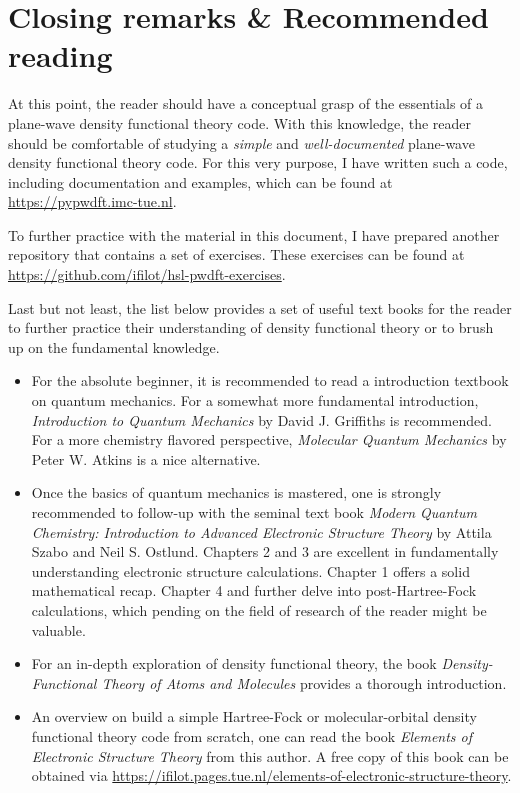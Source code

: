 %
%
%
\section{Closing remarks \& Recommended reading}
\label{chap:further_reading}

At this point, the reader should have a conceptual grasp of the essentials of a plane-wave density functional theory code. With this knowledge, the reader should be comfortable of studying a \textit{simple} and \textit{well-documented} plane-wave density functional theory code. For this very purpose, I have written such a code, including documentation and examples, which can be found at \url{https://pypwdft.imc-tue.nl}. 

To further practice with the material in this document, I have prepared another repository that contains a set of exercises. These exercises can be found at \url{https://github.com/ifilot/hsl-pwdft-exercises}.

Last but not least, the list below provides a set of useful text books for the reader to further practice their understanding of density functional theory or to brush up on the fundamental knowledge.

\begin{itemize}
    \item For the absolute beginner, it is recommended to read a introduction textbook on quantum mechanics. For a somewhat more fundamental introduction, \textit{Introduction to Quantum Mechanics}\cite{2004:griffiths} by David J. Griffiths is recommended. For a more chemistry flavored perspective, \textit{Molecular Quantum Mechanics}\cite{2011:atkins} by Peter W. Atkins is a nice alternative.
    
    \item Once the basics of quantum mechanics is mastered, one is strongly recommended to follow-up with the seminal text book \textit{Modern Quantum Chemistry: Introduction to Advanced Electronic Structure Theory}\cite{szabo} by Attila Szabo and Neil S. Ostlund. Chapters 2 and 3 are excellent in fundamentally understanding electronic structure calculations. Chapter 1 offers a solid mathematical recap. Chapter 4 and further delve into post-Hartree-Fock calculations, which pending on the field of research of the reader might be valuable.

    \item For an in-depth exploration of density functional theory, the book \textit{Density-Functional Theory of Atoms and Molecules}\cite{1994:parr} provides a thorough introduction.

    \item An overview on build a simple Hartree-Fock or molecular-orbital density functional theory code from scratch, one can read the book \textit{Elements of Electronic Structure Theory} from this author. A free copy of this book can be obtained via \url{https://ifilot.pages.tue.nl/elements-of-electronic-structure-theory}.
    
\end{itemize}